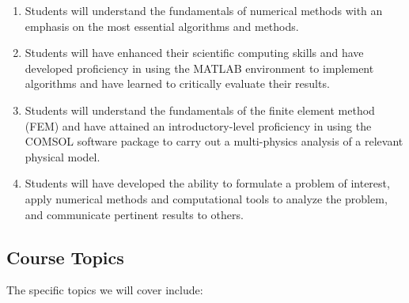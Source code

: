 \begin{enumerate}
\item Students will understand the fundamentals of numerical methods with an emphasis on the most essential algorithms and methods.

\item Students will have enhanced their scientific computing skills and have developed proficiency in using the MATLAB environment to implement algorithms and have learned to critically evaluate their results.

\item Students will understand the fundamentals of the finite element method (FEM) and have attained an introductory-level proficiency in using the COMSOL software package to carry out a multi-physics analysis of a relevant physical model.

\item Students will have developed the ability to formulate a problem of interest, apply numerical methods and computational tools to analyze the problem, and communicate pertinent results to others.
\end{enumerate}


\subsection{Course Topics}
The specific topics we will cover include:

